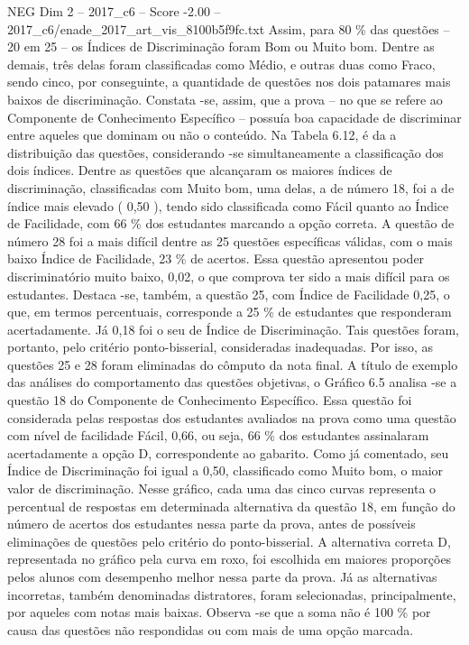 \begin{textsample}{NEG Dim 2 – 2017\_c6 – Score -2.00 – 2017\_c6/enade\_2017\_art\_vis\_8100b5f9fc.txt}
Assim, para 80 \% das questões – 20 em 25 – os Índices de Discriminação foram Bom ou Muito bom.
Dentre as demais, três delas foram classificadas como Médio, e outras duas como Fraco, sendo cinco, por conseguinte, a quantidade de questões nos dois patamares mais baixos de discriminação.
Constata -se, assim, que a prova – no que se refere ao Componente de Conhecimento Específico – possuía boa capacidade de discriminar entre aqueles que dominam ou não o conteúdo.
Na Tabela 6.12, é da a distribuição das questões, considerando -se simultaneamente a classificação dos dois índices.
Dentre as questões que alcançaram os maiores índices de discriminação, classificadas com Muito bom, uma delas, a de número 18, foi a de índice mais elevado ( 0,50 ), tendo sido classificada como Fácil quanto ao Índice de Facilidade, com 66 \% dos estudantes marcando a opção correta.
A questão de número 28 foi a mais difícil dentre as 25 questões específicas válidas, com o mais baixo Índice de Facilidade, 23 \% de acertos.
Essa questão apresentou poder discriminatório muito baixo, 0,02, o que comprova ter sido a mais difícil para os estudantes.
Destaca -se, também, a questão 25, com Índice de Facilidade 0,25, o que, em termos percentuais, corresponde a 25 \% de estudantes que responderam acertadamente.
Já 0,18 foi o seu de Índice de Discriminação.
Tais questões foram, portanto, pelo critério ponto-bisserial, consideradas inadequadas.
Por isso, as questões 25 e 28 foram eliminadas do cômputo da nota final.
A título de exemplo das análises do comportamento das questões objetivas, o Gráfico 6.5 analisa -se a questão 18 do Componente de Conhecimento Específico.
Essa questão foi considerada pelas respostas dos estudantes avaliados na prova como uma questão com nível de facilidade Fácil, 0,66, ou seja, 66 \% dos estudantes assinalaram acertadamente a opção D, correspondente ao gabarito.
Como já comentado, seu Índice de Discriminação foi igual a 0,50, classificado como Muito bom, o maior valor de discriminação.
Nesse gráfico, cada uma das cinco curvas representa o percentual de respostas em determinada alternativa da questão 18, em função do número de acertos dos estudantes nessa parte da prova, antes de possíveis eliminações de questões pelo critério do ponto-bisserial.
A alternativa correta D, representada no gráfico pela curva em roxo, foi escolhida em maiores proporções pelos alunos com desempenho melhor nessa parte da prova.
Já as alternativas incorretas, também denominadas distratores, foram selecionadas, principalmente, por aqueles com notas mais baixas.
Observa -se que a soma não é 100 \% por causa das questões não respondidas ou com mais de uma opção marcada.

\end{textsample}
